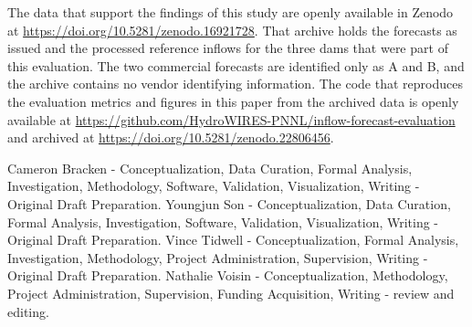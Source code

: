 \documentclass[MLA]{USG} %
\begin{document}
The data that support the findings of this study are openly available in Zenodo at \url{https://doi.org/10.5281/zenodo.16921728}. That archive holds the forecasts as issued and the processed reference inflows for the three dams that were part of this evaluation. The two commercial forecasts are identified only as A and B, and the archive contains no vendor identifying information. The code that reproduces the evaluation metrics and figures in this paper from the archived data is openly available at \url{https://github.com/HydroWIRES-PNNL/inflow-forecast-evaluation} and archived at \url{https://doi.org/10.5281/zenodo.22806456}.



{}

Cameron Bracken - Conceptualization, Data Curation, Formal Analysis, Investigation, Methodology, Software, Validation, Visualization, Writing - Original Draft Preparation. Youngjun Son - Conceptualization, Data Curation, Formal Analysis, Investigation, Software, Validation, Visualization, Writing - Original Draft Preparation. Vince Tidwell - Conceptualization, Formal Analysis, Investigation, Methodology, Project Administration, Supervision, Writing - Original Draft Preparation. Nathalie Voisin - Conceptualization, Methodology, Project Administration, Supervision, Funding Acquisition, Writing - review and editing.







\end{document}
